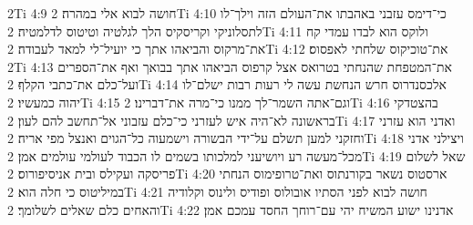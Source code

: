 2Ti 4:9  חושה לבוא אלי במהרה׃
2Ti 4:10  כי־דימס עזבני באהבתו את־העולם הזה וילך־לו לתסלוניקי וקריסקיס הלך לגלטיה וטיטוס לדלמטיה׃
2Ti 4:11  ולוקס הוא לבדו עמדי קח את־מרקוס והביאהו אתך כי יועיל־לי למאד לעבודה׃
2Ti 4:12  את־טוכיקוס שלחתי לאפסוס׃
2Ti 4:13  את־המטפחת שהנחתי בטרואס אצל קרפוס הביאהו אתך בבואך ואף את־הספרים ועל־כלם את־כתבי הקלף׃
2Ti 4:14  אלכסנדרוס חרש הנחשת עשה לי רעות רבות ישלם־לו יהוה כמעשיו׃
2Ti 4:15  וגם־אתה השמר־לך ממנו כי־מרה את־דברינו׃
2Ti 4:16  בהצטדקי בראשונה לא־היה איש לעזרני כי־כלם עזבוני אל־תחשב להם לעון׃
2Ti 4:17  ואדני הוא עזרני וחזקני למען תשלם על־ידי הבשורה וישמעוה כל־הגוים ואנצל מפי אריה׃
2Ti 4:18  ויצילני אדני מכל־מעשה רע ויושיעני למלכותו בשמים לו הכבוד לעולמי עולמים אמן׃
2Ti 4:19  שאל לשלום פריסקה ועקילס ובית אניסיפורוס׃
2Ti 4:20  ארסטוס נשאר בקורנתוס ואת־טרופימוס הנחתי במיליטוס כי חלה הוא׃
2Ti 4:21  חושה לבוא לפני הסתיו אובולוס ופודיס ולינוס וקלודיה והאחים כלם שאלים לשלומך׃
2Ti 4:22  אדנינו ישוע המשיח יהי עם־רוחך החסד עמכם אמן׃


